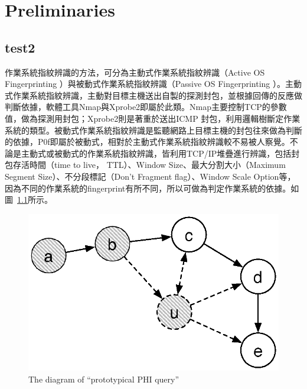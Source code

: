 
\chapter{Preliminaries}
\label{cha:preliminaries} 

\section{test2}
\label{sec:test2}



作業系統指紋辨識的方法，可分為主動式作業系統指紋辨識（Active OS Fingerprinting ）與被動式作業系統指紋辨識（Passive OS Fingerprinting ）。主動式作業系統指紋辨識，主動對目標主機送出自製的探測封包，並根據回傳的反應做判斷依據，軟體工具Nmap與Xprobe2即屬於此類。Nmap主要控制TCP的參數值，做為探測用封包；Xprobe2則是著重於送出ICMP 封包，利用邏輯樹斷定作業系統的類型。被動式作業系統指紋辨識是監聽網路上目標主機的封包往來做為判斷的依據，P0f即屬於被動式，相對於主動式作業系統指紋辨識較不易被人察覺。不論是主動式或被動式的作業系統指紋辨識，皆利用TCP/IP堆疊進行辨識，包括封包存活時間（time to live， TTL）、Window Size、最大分割大小（Maximum Segment Size）、不分段標記（Don't Fragment flag）、Window Scale Option等，因為不同的作業系統的fingerprint有所不同，所以可做為判定作業系統的依據。如圖~\ref{fig:PHI}所示。


\begin{figure}[H]
  \begin{center}
    \includegraphics[width=1.0\textwidth]{figures/dyna_rm.eps}
    \caption{The diagram of ``prototypical PHI query''} 
    \label{fig:PHI}
  \end{center}
\end{figure}